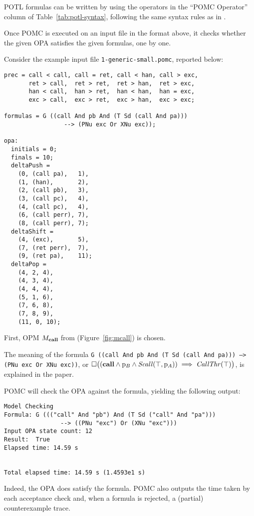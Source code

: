 \documentclass[9pt,a4paper]{article}
\begin{document}
POTL formulas can be written by using the operators in the ``POMC Operator'' column
of Table~\ref{tab:potl-syntax}, following the same syntax rules as in \cite{ChiariMP19,ChiariMP21}.

Once POMC is executed on an input file in the format above,
it checks whether the given OPA satisfies the given formulas,
one by one.

Consider the example input file \texttt{1-generic-small.pomc}, reported below:
\begin{verbatim}
prec = call < call, call = ret, call < han, call > exc,
       ret > call,  ret > ret,  ret > han,  ret > exc,
       han < call,  han > ret,  han < han,  han = exc,
       exc > call,  exc > ret,  exc > han,  exc > exc;

formulas = G ((call And pb And (T Sd (call And pa)))
                 --> (PNu exc Or XNu exc));

opa:
  initials = 0;
  finals = 10;
  deltaPush =
    (0, (call pa),   1),
    (1, (han),       2),
    (2, (call pb),   3),
    (3, (call pc),   4),
    (4, (call pc),   4),
    (6, (call perr), 7),
    (8, (call perr), 7);
  deltaShift =
    (4, (exc),       5),
    (7, (ret perr),  7),
    (9, (ret pa),    11);
  deltaPop =
    (4, 2, 4),
    (4, 3, 4),
    (4, 4, 4),
    (5, 1, 6),
    (7, 6, 8),
    (7, 8, 9),
    (11, 0, 10);
\end{verbatim}
First, OPM $M_{\mathbf{call}}$ from \cite{ChiariMP21} (Figure~\ref{fig:mcall}) is chosen.

The meaning of the formula
\texttt{G ((call And pb And (T Sd (call And pa))) --> (PNu exc Or XNu exc))},
or
\(
  \square \big((\mathbf{call} \land \mathrm{p}_B \land
    \mathit{Scall}(\top, \mathrm{p}_A))
    \implies \mathit{CallThr}(\top) \big)
\),
is explained in the paper.

POMC will check the OPA against the formula, yielding the following output:
\begin{verbatim}
Model Checking
Formula: G ((("call" And "pb") And (T Sd ("call" And "pa")))
                --> ((PNu "exc") Or (XNu "exc")))
Input OPA state count: 12
Result:  True
Elapsed time: 14.59 s


Total elapsed time: 14.59 s (1.4593e1 s)
\end{verbatim}
Indeed, the OPA does satisfy the formula.
POMC also outputs the time taken by each acceptance check and,
when a formula is rejected, a (partial) counterexample trace.
\end{document}

